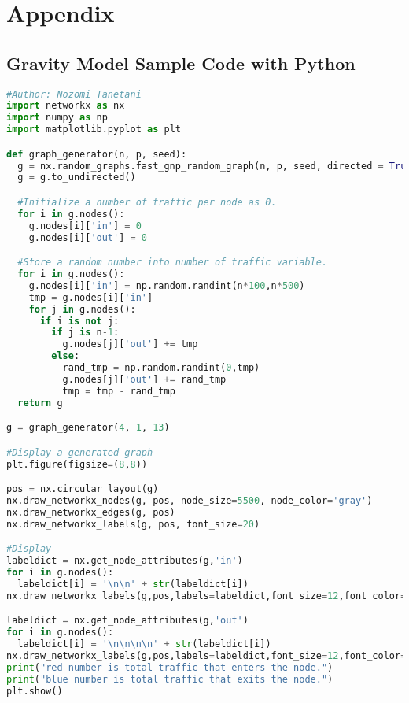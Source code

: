\appendix
\chapter{Appendix}


\section{Gravity Model Sample Code with Python}

\begin{lstlisting}[language=python,caption=Generate Simple Network with Python]
#Author: Nozomi Tanetani
import networkx as nx
import numpy as np
import matplotlib.pyplot as plt 

def graph_generator(n, p, seed):
  g = nx.random_graphs.fast_gnp_random_graph(n, p, seed, directed = True) #Generate a random graph
  g = g.to_undirected()

  #Initialize a number of traffic per node as 0.
  for i in g.nodes():
    g.nodes[i]['in'] = 0
    g.nodes[i]['out'] = 0

  #Store a random number into number of traffic variable.
  for i in g.nodes():
    g.nodes[i]['in'] = np.random.randint(n*100,n*500)
    tmp = g.nodes[i]['in']
    for j in g.nodes():
      if i is not j:
        if j is n-1:
          g.nodes[j]['out'] += tmp
        else:
          rand_tmp = np.random.randint(0,tmp)
          g.nodes[j]['out'] += rand_tmp
          tmp = tmp - rand_tmp
  return g

g = graph_generator(4, 1, 13)

#Display a generated graph
plt.figure(figsize=(8,8))

pos = nx.circular_layout(g)
nx.draw_networkx_nodes(g, pos, node_size=5500, node_color='gray')
nx.draw_networkx_edges(g, pos)
nx.draw_networkx_labels(g, pos, font_size=20)

#Display
labeldict = nx.get_node_attributes(g,'in')
for i in g.nodes():
  labeldict[i] = '\n\n' + str(labeldict[i])
nx.draw_networkx_labels(g,pos,labels=labeldict,font_size=12,font_color='#FFAAAA')

labeldict = nx.get_node_attributes(g,'out')
for i in g.nodes():
  labeldict[i] = '\n\n\n\n' + str(labeldict[i])
nx.draw_networkx_labels(g,pos,labels=labeldict,font_size=12,font_color='#AAFFFF')
print("red number is total traffic that enters the node.")
print("blue number is total traffic that exits the node.")
plt.show()
\end{lstlisting}

